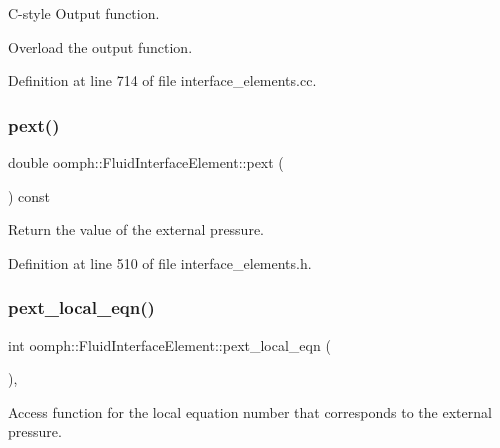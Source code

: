 C-\/style Output function. 

Overload the output function. 

Definition at line 714 of file interface\+\_\+elements.\+cc.

\mbox{\label{classoomph_1_1FluidInterfaceElement_a7c0a2a21afce911c301c75febd3ba44c}} 
\subsubsection{\texorpdfstring{pext()}{pext()}}
{\footnotesize\ttfamily double oomph\+::\+Fluid\+Interface\+Element\+::pext (\begin{DoxyParamCaption}{ }\end{DoxyParamCaption}) const\hspace{0.3cm}{\ttfamily [inline]}}



Return the value of the external pressure. 



Definition at line 510 of file interface\+\_\+elements.\+h.

\mbox{\label{classoomph_1_1FluidInterfaceElement_abd4aece98dee8173c6d796e23ccf1e03}} 
\subsubsection{\texorpdfstring{pext\+\_\+local\+\_\+eqn()}{pext\_local\_eqn()}}
{\footnotesize\ttfamily int oomph\+::\+Fluid\+Interface\+Element\+::pext\+\_\+local\+\_\+eqn (\begin{DoxyParamCaption}{ }\end{DoxyParamCaption})\hspace{0.3cm}{\ttfamily [inline]}, {\ttfamily [protected]}}



Access function for the local equation number that corresponds to the external pressure. 



